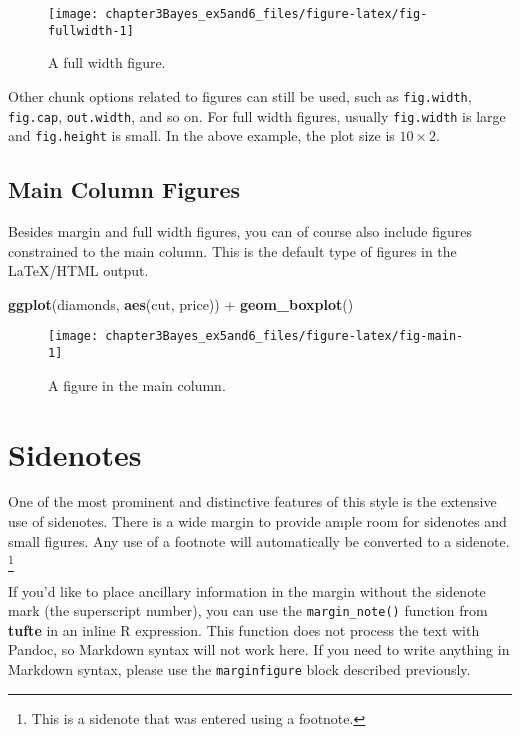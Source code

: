 \documentclass[]{tufte-handout}
\newenvironment{Shaded}{}{}
\newcommand{\KeywordTok}[1]{\textcolor[rgb]{0.00,0.44,0.13}{\textbf{{#1}}}}
\newcommand{\StringTok}[1]{\textcolor[rgb]{0.25,0.44,0.63}{{#1}}}
\newcommand{\NormalTok}[1]{{#1}}
\begin{document}
\begin{figure*}
\texttt{[image: chapter3Bayes\_ex5and6\_files/figure-latex/fig-fullwidth-1]} \caption[A full width figure]{A full width figure.}\label{fig:fig-fullwidth}
\end{figure*}

Other chunk options related to figures can still be used, such as
\texttt{fig.width}, \texttt{fig.cap}, \texttt{out.width}, and so on. For
full width figures, usually \texttt{fig.width} is large and
\texttt{fig.height} is small. In the above example, the plot size is
\(10 \times 2\).

\subsection{Main Column Figures}\label{main-column-figures}

Besides margin and full width figures, you can of course also include
figures constrained to the main column. This is the default type of
figures in the LaTeX/HTML output.

\begin{Shaded}
\begin{Highlighting}[]
\KeywordTok{ggplot}\NormalTok{(diamonds, }\KeywordTok{aes}\NormalTok{(cut, price)) +}\StringTok{ }\KeywordTok{geom_boxplot}\NormalTok{()}
\end{Highlighting}
\end{Shaded}

\begin{figure}
\texttt{[image: chapter3Bayes\_ex5and6\_files/figure-latex/fig-main-1]} \caption[A figure in the main column]{A figure in the main column.}\label{fig:fig-main}
\end{figure}

\section{Sidenotes}\label{sidenotes}

One of the most prominent and distinctive features of this style is the
extensive use of sidenotes. There is a wide margin to provide ample room
for sidenotes and small figures. Any use of a footnote will
automatically be converted to a sidenote. \footnote{This is a sidenote
  that was entered using a footnote.}

If you'd like to place ancillary information in the margin without the
sidenote mark (the superscript number), you can use the
\texttt{margin\_note()} function from \textbf{tufte} in an inline R
expression.
This function does not process the text with Pandoc, so Markdown syntax
will not work here. If you need to write anything in Markdown syntax,
please use the \texttt{marginfigure} block described previously.
\end{document}
